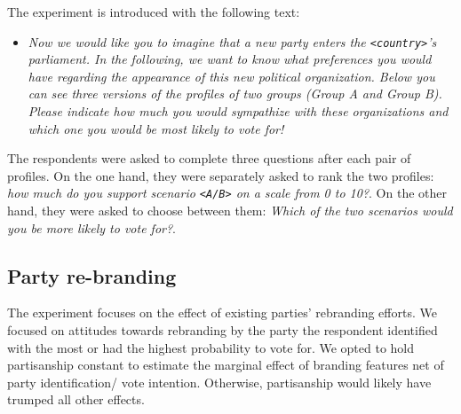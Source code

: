\documentclass[12pt]{article}
\begin{document}
The experiment is introduced with the following text: 
\begin{itemize}
\item[]{\textit{Now we would like you to imagine that a new party enters the \texttt{<country>}'s parliament. In the following, we want to know what preferences you would have regarding the appearance of this new political organization. Below you can see three versions of the profiles of two groups (Group A and Group B). Please indicate how much you would sympathize with these organizations and which one you would be most likely to vote for!}}
\end{itemize}

The respondents were asked to complete three questions after each pair of profiles. On the one hand, they were separately asked to rank the two profiles: \textit{how much do you support scenario \texttt{<A/B>} on a scale from 0 to 10?}. On the other hand, they were asked to choose between them: \textit{Which of the two scenarios would you be more likely to vote for?}.

\subsection{Party re-branding}

The experiment focuses on the effect of existing parties' rebranding efforts. We focused on attitudes towards rebranding by the party the respondent identified with the most or had the highest probability to vote for.  We opted to hold partisanship constant to estimate the marginal effect of branding features net of party identification/ vote intention. Otherwise, partisanship would likely have trumped all other effects.
\end{document}
